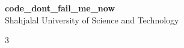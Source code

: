 \documentclass[9pt, a4paper]{extreport}
\begin{document}
\begin{center}
  {\huge \bfseries code\_dont\_fail\_me\_now}\\[0.3em]
  {\large Shahjalal University of Science and Technology}\\[0.2em]
\end{center}

\begin{multicols*}{3}
  \tableofcontents
  \vspace*{10pt}

  
  
  
  
  
  
  
  
  
  
  

  
\end{multicols*}
\end{document}
